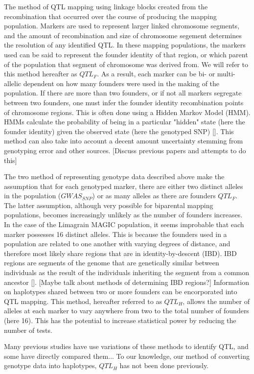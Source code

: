 \documentclass[article,9pt,twocolumn,twoside]{rilabRxiv}
\begin{document}
The method of QTL mapping using linkage blocks created from the recombination that occurred over the course of producing the mapping population.
Markers are used to represent larger linked chromosome segments, and the amount of recombination and size of chromosome segement determines the resolution of any identified QTL.
In these mapping populations, the markers used can be said to represent the founder identity of that region, or which parent of the population that segment of chromosome was derived from. We will refer to this method hereafter as $QTL_F$.
As a result, each marker can be bi- or multi-allelic dependent on how many founders were used in the making of the population.
If there are more than two founders, or if not all markers segregate between two founders, one must infer the founder identity recombination points of chromosome regions.
This is often done using a Hidden Markov Model (HMM). HMMs calculate the probability of being in a particular "hidden" state (here the founder identity) given the observed state (here the genotyped SNP) [].
This method can also take into account a decent amount uncertainty stemming from genotyping error and other sources.
[Discuss previous papers and attempts to do this]

The two method of representing genotype data described above make the assumption that for each genotyped marker, there are either two distinct alleles in the population ($GWAS_{SNP}$) or as many alleles as there are founders $QTL_F$.
The latter assumption, although very possible for biparental mapping populations, becomes increasingly unlikely as the number of founders increases. In the case of the Limagrain MAGIC population, it seems improbable that each marker possesses 16 distinct alleles.
This is because the founders used in a population are related to one another with varying degrees of distance, and therefore most likely share regions that are in identity-by-descent (IBD).
IBD regions are segments of the genome that are genetically similar between individuals as the result of the individuals inheriting the segment from a common ancestor [].
[Maybe talk about methods of determining IBD regions?]
Information on haplotypes shared between two or more founders can be encorporated into QTL mapping.
This method, hereafter referred to as $QTL_H$, allows the number of alleles at each marker to vary anywhere from two to the total number of founders (here 16).
This has the potential to increase statistical power by reducing the number of tests.

Many previous studies have use variations of these methods to identify QTL, and some have directly compared them...
To our knowledge, our method of converting genotype data into haplotypes, $QTL_H$ has not been done previously.
\end{document}
